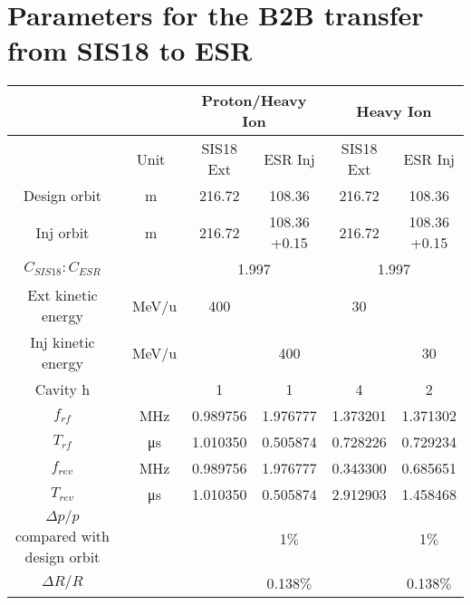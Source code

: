 \newpage
\section{Parameters for the B2B transfer from SIS18 to ESR}
\label{sec:18toESR}



% 
    \begin{longtable}{ | c | c | c | c | c | c |}
    \hline
		\rowcolor[gray]{0.8}
     	 &  & \multicolumn{2}{c|}{Proton/Heavy Ion} & \multicolumn{2}{c|}{Heavy Ion} \\ \hline
		 & Unit &	SIS18 Ext & ESR Inj & SIS18 Ext &	ESR Inj\\ \hline
Design orbit &	m &	 216.72&108.36&	216.72&108.36	\\ \hline
Inj orbit &	m &	 216.72&\tabincell{c}{108.36\\+0.15}&	216.72&\tabincell{c}{108.36\\+0.15}	\\ \hline
$C_{SIS18}:C_{ESR}$&	&	\multicolumn{2}{c|}{1.997}&\multicolumn{2}{c|}{1.997}	\\ \hline
\tabincell{c}{Ext kinetic\\ energy}&	\SI{}{\MeV/\atomicmassunit}&	400 & &30&	\\ \hline
\tabincell{c}{Inj kinetic\\ energy}&	\SI{}{\MeV/\atomicmassunit}&	&400&	&30	\\ \hline
Cavity h&	&1&1&4&2	\\ \hline
$f_{rf}$&\SI{}{\MHz}&	0.989756&1.976777&1.373201&1.371302	\\ \hline$T_{rf}$&\SI{}{\us}&	1.010350&0.505874&0.728226&0.729234\\ \hline
$f_{rev}$&\SI{}{\MHz}&	0.989756&1.976777&0.343300&0.685651\\ \hline
$T_{rev}$&\SI{}{\us}&	1.010350&0.505874&2.912903&1.458468\\ \hline
\tabincell{c}{$\Delta p/p$ compared \\with design orbit}&	&&1$\%$&&1$\%$\\ \hline
$\Delta R/R$&	&&0.138$\%$&&0.138$\%$\\ \hline

\end{longtable}
